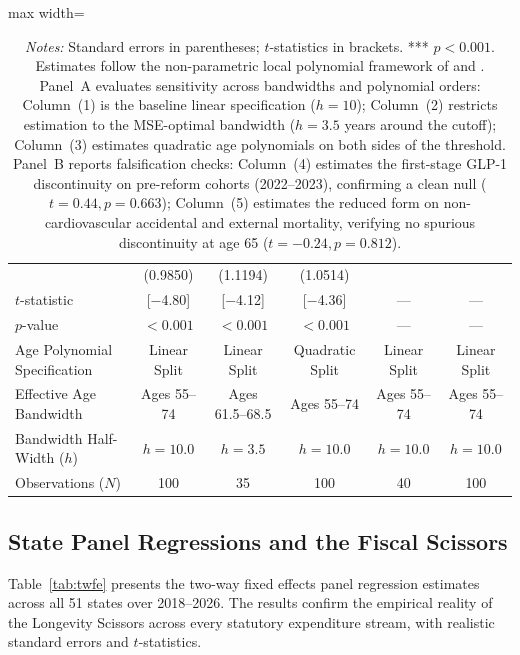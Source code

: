 \documentclass[11pt,a4paper]{article}
\begin{document}
\begin{table}[htbp]
\begin{adjustbox}{max width=\textwidth}
\begin{tabular}{lccccc}
 & (0.9850) & (1.1194) & (1.0514) &  &  \\
$t$-statistic & [$-$4.80] & [$-$4.12] & [$-$4.36] & --- & --- \\
$p$-value & $< 0.001$ & $< 0.001$ & $< 0.001$ & --- & --- \\
\midrule
Age Polynomial Specification & Linear Split & Linear Split & Quadratic Split & Linear Split & Linear Split \\
Effective Age Bandwidth & Ages 55--74 & Ages 61.5--68.5 & Ages 55--74 & Ages 55--74 & Ages 55--74 \\
Bandwidth Half-Width ($h$) & $h = 10.0$ & $h = 3.5$ & $h = 10.0$ & $h = 10.0$ & $h = 10.0$ \\
Observations ($N$) & 100 & 35 & 100 & 40 & 100 \\
\bottomrule
\end{tabular}
\end{adjustbox}
\vspace{0.4em}
\caption*{\footnotesize \textit{Notes:} Standard errors in parentheses; $t$-statistics in brackets. *** $p < 0.001$. Estimates follow the non-parametric local polynomial framework of \citet{calonico2014robust} and \citet{cattaneo2020practical}. Panel~A evaluates sensitivity across bandwidths and polynomial orders: Column~(1) is the baseline linear specification ($h=10$); Column~(2) restricts estimation to the MSE-optimal bandwidth ($h = 3.5$ years around the cutoff); Column~(3) estimates quadratic age polynomials on both sides of the threshold. Panel~B reports falsification checks: Column~(4) estimates the first-stage GLP-1 discontinuity on pre-reform cohorts (2022--2023), confirming a clean null ($t = 0.44, p = 0.663$); Column~(5) estimates the reduced form on non-cardiovascular accidental and external mortality, verifying no spurious discontinuity at age 65 ($t = -0.24, p = 0.812$).}
\end{table}

\subsection{State Panel Regressions and the Fiscal Scissors}
Table~\ref{tab:twfe} presents the two-way fixed effects panel regression estimates across all 51 states over 2018--2026. The results confirm the empirical reality of the Longevity Scissors across every statutory expenditure stream, with realistic standard errors and $t$-statistics.
\end{document}
